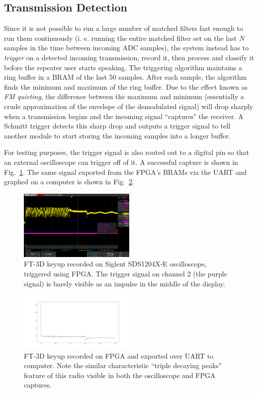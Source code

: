 \documentclass[conference]{IEEEtran}
\begin{document}
\subsection{Transmission Detection}

Since it is not possible to run a large number of matched filters fast enough to run them continuously (i. e. running the entire matched filter set on the last $ N $ samples in the time between incoming ADC samples), the system instead has to \emph{trigger} on a detected incoming transmission, record it, then process and classify it before the repeater user starts speaking. The triggering algorithm maintains a ring buffer in a BRAM of the last 50 samples. After each sample, the algorithm finds the minimum and maximum of the ring buffer. Due to the effect known as \emph{FM quieting}, the difference between the maximum and minimum (essentially a crude approximation of the envelope of the demodulated signal) will drop sharply when a transmission begins and the incoming signal ``captures" the receiver. A Schmitt trigger detects this sharp drop and outputs a trigger signal to tell another module to start storing the incoming samples into a longer buffer.

For testing purposes, the trigger signal is also routed out to a digital pin so that an external oscilloscope can trigger off of it. A successful capture is shown in Fig.~\ref{keyup_oscilloscope}. The same signal exported from the FPGA's BRAMs via the UART and graphed on a computer is shown in Fig.~\ref{keyup_fpga}.

\begin{figure}
    \centerline{\includegraphics[width=0.5\textwidth]{First_Working_Capture_Oscilloscope.png}}
    \caption{FT-3D keyup recorded on Siglent SDS1204X-E oscilloscope, triggered using FPGA. The trigger signal on channel 2 (the purple signal) is barely visible as an impulse in the middle of the display.}
    \label{keyup_oscilloscope}
\end{figure}

\begin{figure}
    \centerline{\includegraphics[width=0.5\textwidth]{First_Working_Capture_FPGA.png}}
    \caption{FT-3D keyup recorded on FPGA and exported over UART to computer. Note the similar characteristic ``triple decaying peaks" feature of this radio visible in both the oscilloscope and FPGA captures.}
    \label{keyup_fpga}
\end{figure}
\end{document}
